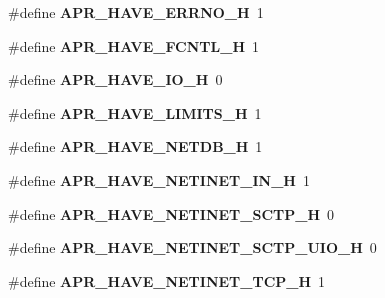 \begin{DoxyCompactItemize}
\item 
\#define {\bfseries A\+P\+R\+\_\+\+H\+A\+V\+E\+\_\+\+E\+R\+R\+N\+O\+\_\+H}~1\hypertarget{group__apr__platform_gabb48338e636d4184f28d8fb08f449f6b}{}\label{group__apr__platform_gabb48338e636d4184f28d8fb08f449f6b}

\item 
\#define {\bfseries A\+P\+R\+\_\+\+H\+A\+V\+E\+\_\+\+F\+C\+N\+T\+L\+\_\+H}~1\hypertarget{group__apr__platform_ga40e3ceafec2098262742573bb28797cf}{}\label{group__apr__platform_ga40e3ceafec2098262742573bb28797cf}

\item 
\#define {\bfseries A\+P\+R\+\_\+\+H\+A\+V\+E\+\_\+\+I\+O\+\_\+H}~0\hypertarget{group__apr__platform_ga2cf42c89ca9d5682dba7b12377342cc0}{}\label{group__apr__platform_ga2cf42c89ca9d5682dba7b12377342cc0}

\item 
\#define {\bfseries A\+P\+R\+\_\+\+H\+A\+V\+E\+\_\+\+L\+I\+M\+I\+T\+S\+\_\+H}~1\hypertarget{group__apr__platform_ga449046121ca29eda9759cb2d30442e80}{}\label{group__apr__platform_ga449046121ca29eda9759cb2d30442e80}

\item 
\#define {\bfseries A\+P\+R\+\_\+\+H\+A\+V\+E\+\_\+\+N\+E\+T\+D\+B\+\_\+H}~1\hypertarget{group__apr__platform_gac92f65f1d27253f3af6d9714e4604550}{}\label{group__apr__platform_gac92f65f1d27253f3af6d9714e4604550}

\item 
\#define {\bfseries A\+P\+R\+\_\+\+H\+A\+V\+E\+\_\+\+N\+E\+T\+I\+N\+E\+T\+\_\+\+I\+N\+\_\+H}~1\hypertarget{group__apr__platform_gab7a6381062416846012d9a0676e0f35c}{}\label{group__apr__platform_gab7a6381062416846012d9a0676e0f35c}

\item 
\#define {\bfseries A\+P\+R\+\_\+\+H\+A\+V\+E\+\_\+\+N\+E\+T\+I\+N\+E\+T\+\_\+\+S\+C\+T\+P\+\_\+H}~0\hypertarget{group__apr__platform_ga933a3c59c351de4f17cfb8601649fd91}{}\label{group__apr__platform_ga933a3c59c351de4f17cfb8601649fd91}

\item 
\#define {\bfseries A\+P\+R\+\_\+\+H\+A\+V\+E\+\_\+\+N\+E\+T\+I\+N\+E\+T\+\_\+\+S\+C\+T\+P\+\_\+\+U\+I\+O\+\_\+H}~0\hypertarget{group__apr__platform_ga1bb6606091cafba71be8c37796d36e8a}{}\label{group__apr__platform_ga1bb6606091cafba71be8c37796d36e8a}

\item 
\#define {\bfseries A\+P\+R\+\_\+\+H\+A\+V\+E\+\_\+\+N\+E\+T\+I\+N\+E\+T\+\_\+\+T\+C\+P\+\_\+H}~1\hypertarget{group__apr__platform_ga2cf9c403892bb0830f24e58b614b8bce}{}\label{group__apr__platform_ga2cf9c403892bb0830f24e58b614b8bce}


\end{DoxyCompactItemize}
